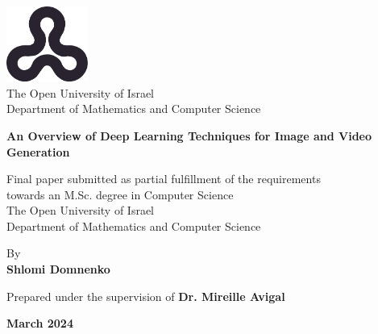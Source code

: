 \begin{titlepage}
    \begin{center}
        \vspace*{1cm}
        
        \includegraphics[width=0.2\textwidth]{images/ou_logo.png}\\
        The Open University of Israel\\
        Department of Mathematics and Computer Science
        
        \vspace{2cm}
        
        {\Large \textbf{An Overview of Deep Learning Techniques for Image and Video Generation}}
        \vspace{1.5cm}
        
        Final paper submitted as partial fulfillment of the requirements\\towards an M.Sc. degree in Computer Science\\
        The Open University of Israel\\
        Department of Mathematics and Computer Science
        
        \vspace{1cm}
        
        By \\
        \textbf{Shlomi Domnenko}
        
        \vspace{1cm}
        
        Prepared under the supervision of \textbf{Dr. Mireille Avigal}
        
        \vfill
        
        \textbf{March 2024}
    \end{center}
\end{titlepage}